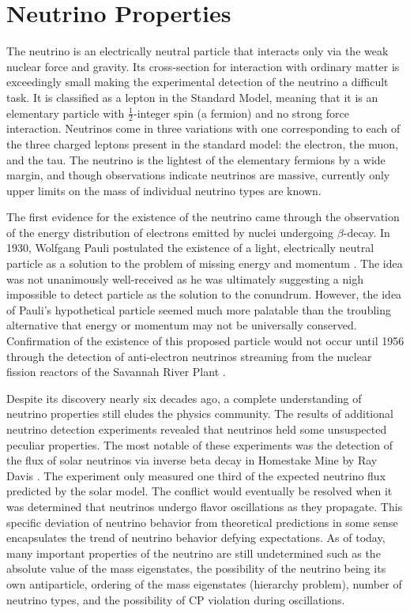 \documentclass{gatech-thesis}
\begin{document}
\chapter{Neutrino Properties}
The neutrino is an electrically neutral particle that interacts only via the weak nuclear force and gravity. Its cross-section for interaction with ordinary matter is exceedingly small making the experimental detection of the neutrino a difficult task. It is classified as a lepton in the Standard Model, meaning that it is an elementary particle with $\frac{1}{2}$-integer spin (a fermion) and no strong force interaction. Neutrinos come in three variations with one corresponding to each of the three charged leptons present in the standard model: the electron, the muon, and the tau. The neutrino is the lightest of the  elementary fermions by a wide margin, and though observations indicate neutrinos are massive, currently only upper limits on the mass of individual neutrino types are known.

The first evidence for the existence of the neutrino came through the observation of the energy distribution of electrons emitted by nuclei undergoing $\beta$-decay. In 1930, Wolfgang Pauli postulated the existence of a light, electrically neutral particle as a solution to the problem of missing energy and momentum \cite{PauliLetter}. The idea was not unanimously well-received as he was ultimately suggesting a nigh impossible to detect particle as the solution to the conundrum. However, the idea of Pauli's hypothetical particle seemed much more palatable than the troubling alternative that energy or momentum may not be universally conserved. Confirmation of the existence of this proposed particle would not occur until 1956 through the detection of anti-electron neutrinos streaming from the nuclear fission reactors of the Savannah River Plant \cite{1956Sci...124..103C}.

Despite its discovery nearly six decades ago, a complete understanding of neutrino properties still eludes the physics community. The results of additional neutrino detection experiments revealed that neutrinos held some unsuspected peculiar properties. The most notable of these experiments was the detection of the flux of solar neutrinos via inverse beta decay in Homestake Mine by Ray Davis \cite{PhysRevLett.20.1205}. The experiment only measured one third of the expected neutrino flux predicted by the solar model. The conflict would eventually be resolved when it was determined that neutrinos undergo flavor oscillations as they propagate. This specific deviation of neutrino behavior from theoretical predictions in some sense encapsulates the trend of neutrino behavior defying expectations. As of today, many important properties of the neutrino are still undetermined such as the absolute value of the mass eigenstates, the possibility of the neutrino being its own antiparticle, ordering of the mass eigenstates (hierarchy problem), number of neutrino types, and the possibility of CP violation during oscillations. 
\end{document}
